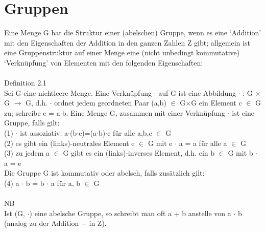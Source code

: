 %


\section{Gruppen}
Eine Menge G hat die Struktur einer (abelschen) Gruppe, wenn es eine ‘Addition’ mit den Eigenschaften der Addition in den ganzen Zahlen Z gibt; allgemein ist eine Gruppenstruktur auf einer Menge eine (nicht unbedingt kommutative) ‘Verknüpfung’ von Elementen mit den folgenden Eigenschaften: \\
\\
Definition 2.1\\
Sei G eine nichtleere Menge. Eine Verknüpfung $\cdot$ auf G ist eine Abbildung $\cdot$ : G $\times$ G $\to$ G, d.h. $\cdot$ ordnet jedem geordneten Paar (a,b) $\in$ G$\times$G ein Element c $\in$ G zu; schreibe c = a$\cdot$b. Eine Menge G, zusammen mit einer Verknüpfung $\cdot$ ist eine Gruppe, falls gilt: \\
(1) $\cdot$ ist assoziativ: a$\cdot$(b$\cdot$c)=(a$\cdot$b)$\cdot$c für alle a,b,c $\in$ G\\
(2) es gibt ein (links)-neutrales Element e $\in$ G mit e $\cdot$ a = a für alle a $\in$ G \\
(3) zu jedem a $\in$ G gibt es ein (links)-inverses Element, d.h. ein b $\in$ G mit b $\cdot$ a = e \\
Die Gruppe G ist kommutativ oder abelsch, falls zusätzlich gilt: \\
(4) a $\cdot$ b = b $\cdot$ a für a, b $\in$ G\\ 
\\
NB\\
Ist (G, $\cdot$) eine abelsche Gruppe, so schreibt man oft a + b anstelle von a $\cdot$ b (analog zu der Addition + in Z).
